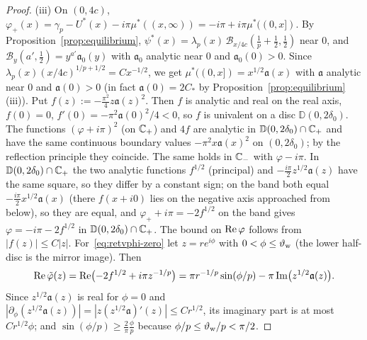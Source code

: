 \begin{proof}
(iii) On $(0,4c)$, $\varphi_+(x)=\gamma_p-U^*(x)-i\pi\mu^*((x,\infty))=-i\pi+i\pi\mu^*((0,x])$. By
Proposition~\ref{prop:equilibrium}, $\psi^*(x)=\lambda_p(x)\,\mathcal B_{x/4c}(\frac1p+\frac12,\frac12)$ near $0$,
and $\mathcal B_y(a',\frac12)=y^{a'}\mathfrak a_0(y)$ with $\mathfrak a_0$ analytic near $0$ and $\mathfrak a_0(0)>0$. Since
$\lambda_p(x)(x/4c)^{1/p+1/2}=Cx^{-1/2}$, we get $\mu^*((0,x])=x^{1/2}\mathfrak a(x)$ with $\mathfrak a$ analytic near
$0$ and $\mathfrak a(0)>0$ (in fact $\mathfrak a(0)=2C_*$ by Proposition~\ref{prop:equilibrium}(iii)). Put
$f(z):=-\frac{\pi^2}{4}z\mathfrak a(z)^2$. Then $f$ is analytic and real on the real axis, $f(0)=0$,
$f'(0)=-\pi^2\mathfrak a(0)^2/4<0$, so $f$ is univalent on a disc $\mathbb D(0,2\delta_0)$. The functions
$(\varphi+i\pi)^2$ (on $\mathbb{C}_+$) and $4f$ are analytic in $\mathbb D(0,2\delta_0)\cap\mathbb{C}_+$ and have the same continuous boundary
values $-\pi^2x\mathfrak a(x)^2$ on $(0,2\delta_0)$; by the reflection principle they coincide. The same holds in $\mathbb{C}_-$
with $\varphi-i\pi$. In $\mathbb D(0,2\delta_0)\cap\mathbb{C}_+$ the two analytic functions $f^{1/2}$ (principal) and
$-\frac{i\pi}2z^{1/2}\mathfrak a(z)$ have the same square, so they differ by a constant sign; on the band both equal
$-\frac{i\pi}2x^{1/2}\mathfrak a(x)$ (there $f(x+i0)$ lies on the negative axis approached from below), so they are
equal, and $\varphi_++i\pi=-2f^{1/2}$ on the band gives $\varphi=-i\pi-2f^{1/2}$ in $\mathbb D(0,2\delta_0)\cap\mathbb{C}_+$. The bound
on $\operatorname{Re}\varphi$ follows from $|f(z)|\le C|z|$. For~\eqref{eq:retvphi-zero} let $z=re^{i\phi}$ with
$0<\phi\le\vartheta_{\mathrm{w}}$ (the lower half-disc is the mirror image). Then
\[
  \operatorname{Re}\tilde\varphi(z)=\operatorname{Re}\bigl(-2f^{1/2}+i\pi z^{-1/p}\bigr)=\pi r^{-1/p}\sin(\phi/p)-\pi\operatorname{Im}\bigl(z^{1/2}\mathfrak a(z)\bigr).
\]
Since $z^{1/2}\mathfrak a(z)$ is real for $\phi=0$ and $|\partial_\phi(z^{1/2}\mathfrak a(z))|=|z(z^{1/2}\mathfrak
a)'(z)|\le Cr^{1/2}$, its imaginary part is at most $Cr^{1/2}\phi$; and $\sin(\phi/p)\ge\frac2\pi\frac\phi p$
because $\phi/p\le\vartheta_{\mathrm{w}}/p<\pi/2$.


\end{proof}
